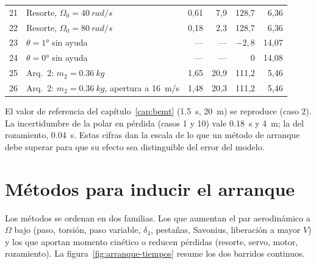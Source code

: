 \begin{table}[H]
\begin{tabular}{rlrrrr}
21 & Resorte, $\Omega_0=\SI{40}{rad/s}$ & 0,61 & 7,9 & 128,7 & 6,36 \\
22 & Resorte, $\Omega_0=\SI{80}{rad/s}$ & 0,18 & 2,3 & 128,7 & 6,36 \\
\midrule
23 & $\theta=\ang{+1}$ sin ayuda & --- & --- & $-2{,}8$ & 14,07 \\
24 & $\theta=\ang{0}$ sin ayuda & --- & --- & 0 & 14,08 \\
\midrule
25 & Arq.~2: $m_2=\SI{0.36}{kg}$ & 1,65 & 20,9 & 111,2 & 5,46 \\
26 & Arq.~2: $m_2=\SI{0.36}{kg}$, apertura a \SI{16}{m/s} & 1,48 & 20,3 & 111,2 & 5,46 \\
\bottomrule
\end{tabular}
\end{table}

El valor de referencia del capítulo~\ref{cap:bemt} (\SI{1.5}{s}, \SI{20}{m}) se reproduce
(caso 2). La incertidumbre de la polar en pérdida (casos 1 y 10) vale \SI{0.18}{s} y
\SI{4}{m}; la del rozamiento, \SI{0.04}{s}. Estas cifras dan la escala de lo que un método
de arranque debe superar para que su efecto sea distinguible del error del modelo.

\section{Métodos para inducir el arranque}\label{sec:arranque-metodos}

Los métodos se ordenan en dos familias. Los que aumentan el par aerodinámico a $\Omega$ bajo
(paso, torsión, paso variable, $\delta_3$, pestañas, Savonius, liberación a mayor $V$) y los
que aportan momento cinético o reducen pérdidas (resorte, servo, motor, rozamiento). La
figura~\ref{fig:arranque-tiempos} resume los dos barridos continuos.


